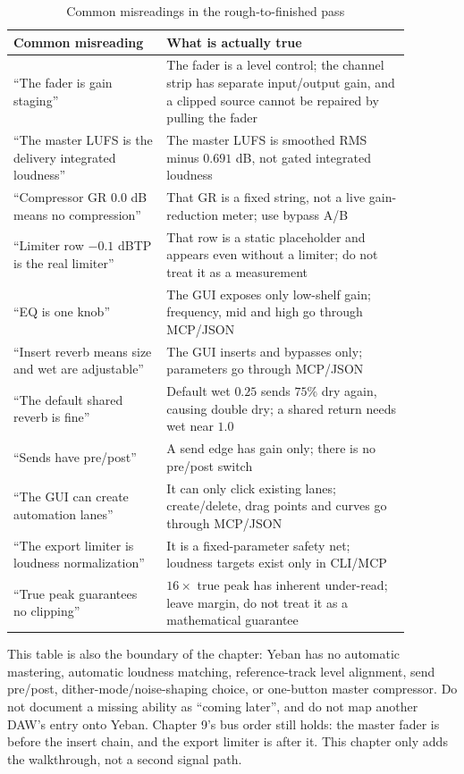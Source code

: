 \begin{table}[htbp]
\centering
\small
\begin{tabular}{@{}p{0.34\linewidth}p{0.54\linewidth}@{}}
\hline
Common misreading & What is actually true \\
\hline
``The fader is gain staging'' & The fader is a level control; the channel strip has separate input/output gain, and a clipped source cannot be repaired by pulling the fader \\
``The master LUFS is the delivery integrated loudness'' & The master LUFS is smoothed RMS minus $0.691$ dB, not gated integrated loudness \\
``Compressor GR 0.0 dB means no compression'' & That GR is a fixed string, not a live gain-reduction meter; use bypass A/B \\
``Limiter row $-0.1$ dBTP is the real limiter'' & That row is a static placeholder and appears even without a limiter; do not treat it as a measurement \\
``EQ is one knob'' & The GUI exposes only low-shelf gain; frequency, mid and high go through MCP/JSON \\
``Insert reverb means size and wet are adjustable'' & The GUI inserts and bypasses only; parameters go through MCP/JSON \\
``The default shared reverb is fine'' & Default wet $0.25$ sends $75\%$ dry again, causing double dry; a shared return needs wet near $1.0$ \\
``Sends have pre/post'' & A send edge has gain only; there is no pre/post switch \\
``The GUI can create automation lanes'' & It can only click existing lanes; create/delete, drag points and curves go through MCP/JSON \\
``The export limiter is loudness normalization'' & It is a fixed-parameter safety net; loudness targets exist only in CLI/MCP \\
``True peak guarantees no clipping'' & $16\times$ true peak has inherent under-read; leave margin, do not treat it as a mathematical guarantee \\
\hline
\end{tabular}
\caption{Common misreadings in the rough-to-finished pass}
\label{tab:walk-pitfalls}
\end{table}

This table is also the boundary of the chapter: Yeban has no automatic mastering, automatic loudness matching, reference-track level alignment, send pre/post, dither-mode/noise-shaping choice, or one-button master compressor. Do not document a missing ability as ``coming later'', and do not map another DAW's entry onto Yeban. Chapter 9's bus order still holds: the master fader is before the insert chain, and the export limiter is after it. This chapter only adds the walkthrough, not a second signal path.

